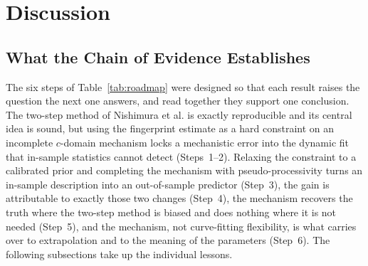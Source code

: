 \section{Discussion}
\subsection{What the Chain of Evidence Establishes}
The six steps of Table~\ref{tab:roadmap} were designed so that each result raises the question the next one answers, and read together they support one conclusion. The two-step method of Nishimura et al. is exactly reproducible and its central idea is sound, but using the fingerprint estimate as a hard constraint on an incomplete $c$-domain mechanism locks a mechanistic error into the dynamic fit that in-sample statistics cannot detect (Steps~1--2). Relaxing the constraint to a calibrated prior and completing the mechanism with pseudo-processivity turns an in-sample description into an out-of-sample predictor (Step~3), the gain is attributable to exactly those two changes (Step~4), the mechanism recovers the truth where the two-step method is biased and does nothing where it is not needed (Step~5), and the mechanism, not curve-fitting flexibility, is what carries over to extrapolation and to the meaning of the parameters (Step~6). The following subsections take up the individual lessons.

